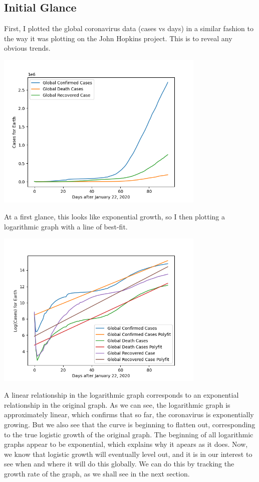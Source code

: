 \documentclass{report}
\begin{document}
        \subsection{Initial Glance}
            First, I plotted the global coronavirus data (cases vs days) in a similar fashion to the way it was plotting on the John Hopkins project. This is to reveal any obvious trends.
            \begin{center}
                \includegraphics[width=10cm]{plots/global/cases.png}
            \end{center}
            At a first glance, this looks like exponential growth, so I then plotting a logarithmic graph with a line of best-fit.
            \begin{center}
                \includegraphics[width=10cm]{plots/global/log(cases).png}
            \end{center}
            A linear relationship in the logarithmic graph corresponds to an exponential relationship in the original graph. As we can see, the logarithmic graph is approximately linear, which confirms that so far, the coronavirus is exponentially growing. But we also see that the curve is beginning to flatten out, corresponding to the true logistic growth of the original graph. The beginning of all logarithmic graphs appear to be exponential, which explains why it apears as it does. 
            \newline
            \indent Now, we know that logistic growth will eventually level out, and it is in our interest to see when and where it will do this globally. We can do this by tracking the growth rate of the graph, as we shall see in the next section. 
\end{document}
